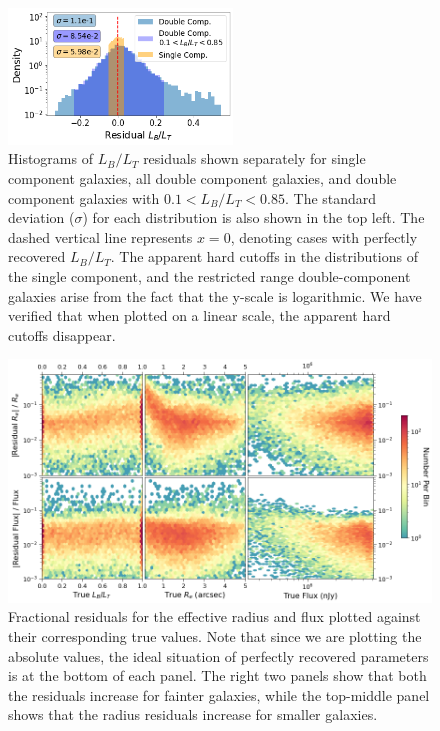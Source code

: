 \begin{figure}[hbt]
    \centering
    \includegraphics[width
    =0.53\textwidth]{residual_hist_bt_sep.png}
    \caption{Histograms of $L_B/L_T$ residuals shown separately for single component galaxies, all double component galaxies, and double component galaxies with $0.1 < L_B/L_T < 0.85$. The standard deviation ($\sigma$) for each distribution is also shown in the top left. The dashed vertical line represents $x = 0$, denoting cases with perfectly recovered $L_B/L_T$. The apparent hard cutoffs in the distributions of the single component, and the restricted range double-component galaxies arise from the fact that the y-scale is logarithmic. We have verified that when plotted on a linear scale, the apparent hard cutoffs disappear.}
    \label{fig_c2:residual_hist_bt_sep}
\end{figure}

\begin{figure}[htb]
    \centering
    \includegraphics[width
    =\textwidth]{2d_hist_residuals_norm.png}
    \caption{Fractional residuals for the effective radius and flux plotted against their corresponding true values. Note that since we are plotting the absolute values, the ideal situation of perfectly recovered parameters is at the bottom of each panel. The right two panels show that both the residuals increase for fainter galaxies, while the top-middle panel shows that the radius residuals increase for smaller galaxies.}
    \label{fig_c2:2d_residual_hists_norm}
\end{figure}


